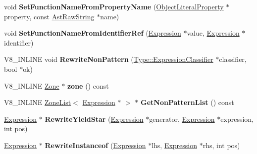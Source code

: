 \begin{DoxyCompactItemize}
\item 
void {\bfseries Set\+Function\+Name\+From\+Property\+Name} (\hyperlink{classv8_1_1internal_1_1_object_literal_property}{Object\+Literal\+Property} $\ast$property, const \hyperlink{classv8_1_1internal_1_1_ast_raw_string}{Ast\+Raw\+String} $\ast$name)\hypertarget{classv8_1_1internal_1_1_parser_traits_a0659af5ab20adb3b37e1f95c00520837}{}\label{classv8_1_1internal_1_1_parser_traits_a0659af5ab20adb3b37e1f95c00520837}

\item 
void {\bfseries Set\+Function\+Name\+From\+Identifier\+Ref} (\hyperlink{classv8_1_1internal_1_1_expression}{Expression} $\ast$value, \hyperlink{classv8_1_1internal_1_1_expression}{Expression} $\ast$identifier)\hypertarget{classv8_1_1internal_1_1_parser_traits_a7491ddd97c54e0733b3d9494ad3f9ce1}{}\label{classv8_1_1internal_1_1_parser_traits_a7491ddd97c54e0733b3d9494ad3f9ce1}

\item 
V8\+\_\+\+I\+N\+L\+I\+NE void {\bfseries Rewrite\+Non\+Pattern} (\hyperlink{classv8_1_1internal_1_1_expression_classifier}{Type\+::\+Expression\+Classifier} $\ast$classifier, bool $\ast$ok)\hypertarget{classv8_1_1internal_1_1_parser_traits_afd838741d77807879f8c5893e815782f}{}\label{classv8_1_1internal_1_1_parser_traits_afd838741d77807879f8c5893e815782f}

\item 
V8\+\_\+\+I\+N\+L\+I\+NE \hyperlink{classv8_1_1internal_1_1_zone}{Zone} $\ast$ {\bfseries zone} () const \hypertarget{classv8_1_1internal_1_1_parser_traits_a47ad5341dbd88592a99a7a3cf2c458b8}{}\label{classv8_1_1internal_1_1_parser_traits_a47ad5341dbd88592a99a7a3cf2c458b8}

\item 
V8\+\_\+\+I\+N\+L\+I\+NE \hyperlink{classv8_1_1internal_1_1_zone_list}{Zone\+List}$<$ \hyperlink{classv8_1_1internal_1_1_expression}{Expression} $\ast$ $>$ $\ast$ {\bfseries Get\+Non\+Pattern\+List} () const \hypertarget{classv8_1_1internal_1_1_parser_traits_a1b4146e234b7af4eaa92665f27ecc339}{}\label{classv8_1_1internal_1_1_parser_traits_a1b4146e234b7af4eaa92665f27ecc339}

\item 
\hyperlink{classv8_1_1internal_1_1_expression}{Expression} $\ast$ {\bfseries Rewrite\+Yield\+Star} (\hyperlink{classv8_1_1internal_1_1_expression}{Expression} $\ast$generator, \hyperlink{classv8_1_1internal_1_1_expression}{Expression} $\ast$expression, int pos)\hypertarget{classv8_1_1internal_1_1_parser_traits_aa76b9d24a487fc8ed8e473dcc8502293}{}\label{classv8_1_1internal_1_1_parser_traits_aa76b9d24a487fc8ed8e473dcc8502293}

\item 
\hyperlink{classv8_1_1internal_1_1_expression}{Expression} $\ast$ {\bfseries Rewrite\+Instanceof} (\hyperlink{classv8_1_1internal_1_1_expression}{Expression} $\ast$lhs, \hyperlink{classv8_1_1internal_1_1_expression}{Expression} $\ast$rhs, int pos)\hypertarget{classv8_1_1internal_1_1_parser_traits_af6b43e2f8ad2b9d1e6bd39987c059ab7}{}\label{classv8_1_1internal_1_1_parser_traits_af6b43e2f8ad2b9d1e6bd39987c059ab7}

\end{DoxyCompactItemize}
